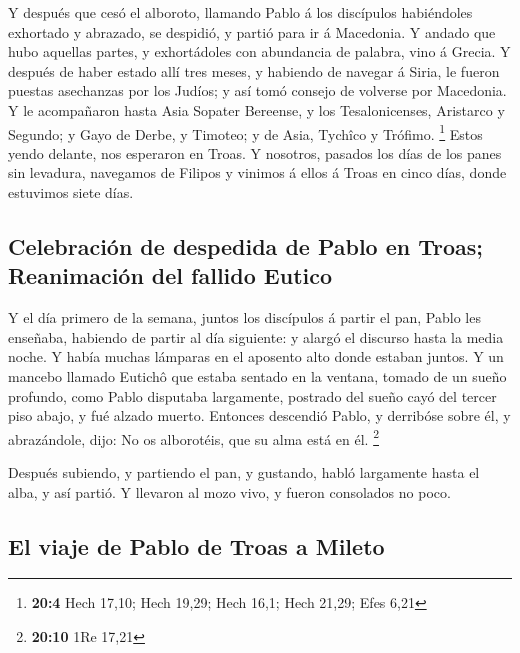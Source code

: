  Y después que cesó el alboroto, llamando Pablo á los
discípulos habiéndoles exhortado y abrazado, se despidió, y partió para
ir á Macedonia.  Y andado que hubo aquellas partes, y
exhortádoles con abundancia de palabra, vino á Grecia.  Y
después de haber estado allí tres meses, y habiendo de navegar á Siria,
le fueron puestas asechanzas por los Judíos; y así tomó consejo de
volverse por Macedonia.  Y le acompañaron hasta Asia
Sopater Bereense, y los Tesalonicenses, Aristarco y Segundo; y Gayo de
Derbe, y Timoteo; y de Asia, Tychîco y Trófimo. \footnote{\textbf{20:4}
  Hech 17,10; Hech 19,29; Hech 16,1; Hech 21,29; Efes 6,21}
 Estos yendo delante, nos esperaron en Troas.
 Y nosotros, pasados los días de los panes sin levadura,
navegamos de Filipos y vinimos á ellos á Troas en cinco días, donde
estuvimos siete días.

\hypertarget{celebraciuxf3n-de-despedida-de-pablo-en-troas-reanimaciuxf3n-del-fallido-eutico}{%
\subsection{Celebración de despedida de Pablo en Troas; Reanimación del
fallido
Eutico}\label{celebraciuxf3n-de-despedida-de-pablo-en-troas-reanimaciuxf3n-del-fallido-eutico}}

 Y el día primero de la semana, juntos los discípulos á
partir el pan, Pablo les enseñaba, habiendo de partir al día siguiente:
y alargó el discurso hasta la media noche.  Y había muchas
lámparas en el aposento alto donde estaban juntos.  Y un
mancebo llamado Eutichô que estaba sentado en la ventana, tomado de un
sueño profundo, como Pablo disputaba largamente, postrado del sueño cayó
del tercer piso abajo, y fué alzado muerto.  Entonces
descendió Pablo, y derribóse sobre él, y abrazándole, dijo: No os
alborotéis, que su alma está en él. \footnote{\textbf{20:10} 1Re 17,21}

 Después subiendo, y partiendo el pan, y gustando, habló
largamente hasta el alba, y así partió.  Y llevaron al
mozo vivo, y fueron consolados no poco.

\hypertarget{el-viaje-de-pablo-de-troas-a-mileto}{%
\subsection{El viaje de Pablo de Troas a
Mileto}\label{el-viaje-de-pablo-de-troas-a-mileto}}

